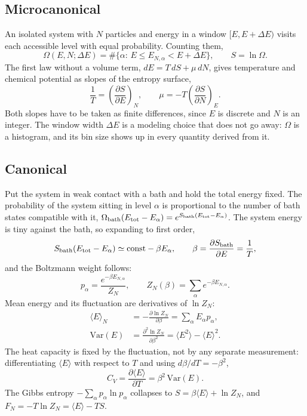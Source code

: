 \documentclass[twocolumn,10pt]{article}
\newcommand{\avg}[1]{\langle #1 \rangle}
\newcommand{\Var}{\mathrm{Var}}
\begin{document}
\subsection{Microcanonical}
An isolated system with $N$ particles and energy in a window $[E,E+\Delta E)$
visits each accessible level with equal probability. Counting them,
\begin{equation}
\Omega(E,N;\Delta E)=\#\{\alpha:\,E\le E_{N,\alpha}<E+\Delta E\},\qquad
S=\ln\Omega .
\end{equation}
The first law without a volume term, $dE=T\,dS+\mu\,dN$, gives temperature and
chemical potential as slopes of the entropy surface,
\begin{equation}
\frac1T=\left(\frac{\partial S}{\partial E}\right)_{\!N},\qquad
\mu=-T\left(\frac{\partial S}{\partial N}\right)_{\!E}.
\label{eq:micro-Tmu}
\end{equation}
Both slopes have to be taken as finite differences, since $E$ is discrete and $N$
is an integer. The window width $\Delta E$ is a modeling choice that does not go
away: $\Omega$ is a histogram, and its bin size shows up in every quantity
derived from it.

\subsection{Canonical}
Put the system in weak contact with a bath and hold the total energy fixed. The
probability of the system sitting in level $\alpha$ is proportional to the number
of bath states compatible with it, $\Omega_{\rm bath}(E_{\rm tot}-E_\alpha)=
e^{S_{\rm bath}(E_{\rm tot}-E_\alpha)}$. The system energy is tiny against the
bath, so expanding to first order,
\begin{equation}
S_{\rm bath}(E_{\rm tot}-E_\alpha)\simeq \text{const}-\beta E_\alpha,\qquad
\beta=\frac{\partial S_{\rm bath}}{\partial E}=\frac1T,
\end{equation}
and the Boltzmann weight follows:
\begin{equation}
p_\alpha=\frac{e^{-\beta E_{N,\alpha}}}{Z_N},\qquad
Z_N(\beta)=\sum_\alpha e^{-\beta E_{N,\alpha}} .
\end{equation}
Mean energy and its fluctuation are derivatives of $\ln Z_N$:
\begin{align}
\avg E_N&=-\frac{\partial \ln Z_N}{\partial\beta}=\sum_\alpha E_\alpha p_\alpha,\\
\Var(E)&=\frac{\partial^2\ln Z_N}{\partial\beta^2}
=\avg{E^2}-\avg E^2 .
\end{align}
The heat capacity is fixed by the fluctuation, not by any separate measurement:
differentiating $\avg E$ with respect to $T$ and using $d\beta/dT=-\beta^2$,
\begin{equation}
C_V=\frac{\partial\avg E}{\partial T}=\beta^2\,\Var(E).
\label{eq:cv}
\end{equation}
The Gibbs entropy $-\sum_\alpha p_\alpha\ln p_\alpha$ collapses to
$S=\beta\avg E+\ln Z_N$, and $F_N=-T\ln Z_N=\avg E-TS$.
\end{document}
